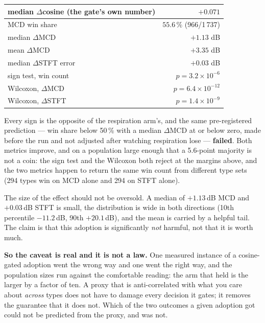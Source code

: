 \documentclass[10pt,twocolumn,a4paper]{article}
\begin{document}
\begin{center}\footnotesize
\setlength{\tabcolsep}{5pt}
\begin{tabular}{@{}l r@{}}
\toprule
median $\Delta$cosine (the gate's own number) & $\mathbf{+0.071}$ \\
\midrule
MCD win share & $\mathbf{55.6\,\%}$ (966/1\,737) \\
median $\Delta$MCD & $\mathbf{+1.13}$ dB \\
mean $\Delta$MCD & $+3.35$ dB \\
median $\Delta$STFT error & $+0.03$ dB \\
sign test, win count & $p = 3.2 \times 10^{-6}$ \\
Wilcoxon, $\Delta$MCD & $p = 6.4 \times 10^{-12}$ \\
Wilcoxon, $\Delta$STFT & $p = 1.4 \times 10^{-9}$ \\
\bottomrule
\end{tabular}
\end{center}

Every sign is the opposite of the respiration arm's, and the same pre-registered prediction ---
win share below 50\,\% with a median $\Delta$MCD at or below zero, made before the run and not
adjusted after watching respiration lose --- \textbf{failed}. Both metrics improve, and on a
population large enough that a 5.6-point majority is not a coin: the sign test and the Wilcoxon
both reject at the margins above, and the two metrics happen to return the same win count from
different type sets (294 types win on MCD alone and 294 on STFT alone).

The size of the effect should not be oversold. A median of $+1.13$\,dB MCD and $+0.03$\,dB STFT
is small, the distribution is wide in both directions (10th percentile $-11.2$\,dB, 90th
$+20.1$\,dB), and the mean is carried by a helpful tail. The claim is that this adoption is
significantly \emph{not} harmful, not that it is worth much.

\textbf{So the caveat is real and it is not a law.} One measured instance of a cosine-gated
adoption went the wrong way and one went the right way, and the population sizes run against
the comfortable reading: the arm that held is the larger by a factor of ten. A proxy that is
anti-correlated with what you care about \emph{across} types does not have to damage every
decision it gates; it removes the guarantee that it does not. Which of the two outcomes a given
adoption got could not be predicted from the proxy, and was not.
\end{document}
